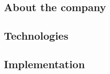 \subsection{About the company}

\newpage
\subsection{Technologies}

\newpage
\subsection{Implementation}
